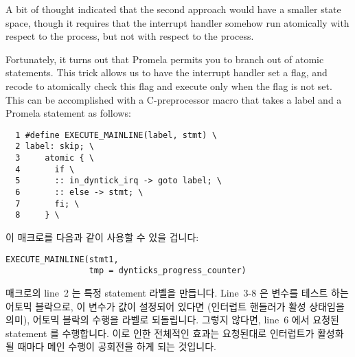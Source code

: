 A bit of thought indicated that the second approach would have a
smaller state space, though it requires that the interrupt handler
somehow run atomically with respect to the 
process, but not with respect to the 
process.

Fortunately, it turns out that Promela permits you to branch
out of atomic statements.
This trick allows us to have the interrupt handler set a flag, and
recode  to atomically check this flag
and execute only when the flag is not set.
This can be accomplished with a C-preprocessor macro that takes
a label and a Promela statement as follows:
\fi

{ \scriptsize
\begin{verbatim}
  1 #define EXECUTE_MAINLINE(label, stmt) \
  2 label: skip; \
  3     atomic { \
  4       if \
  5       :: in_dyntick_irq -> goto label; \
  6       :: else -> stmt; \
  7       fi; \
  8     } \
\end{verbatim}
}

이 매크로를 다음과 같이 사용할 수 있을 겁니다:
\iffalse

One might use this macro as follows:
\fi

\vspace{5pt}
\begin{minipage}[t]{\columnwidth}
\scriptsize
\begin{verbatim}
EXECUTE_MAINLINE(stmt1,
                 tmp = dynticks_progress_counter)
\end{verbatim}
\end{minipage}
\vspace{5pt}

매크로의 line~2 는 특정 statement 라벨을 만듭니다.
Line~3-8 은  변수를 테스트 하는 어토믹 블락으로, 이 변수가
값이 설정되어 있다면 (인터럽트 핸들러가 활성 상태임을 의미), 어토믹 블락의
수행을 라벨로 되돌립니다.
그렇지 않다면, line~6 에서 요청된 statement 를 수행합니다.
이로 인한 전체적인 효과는 요청된대로 인터럽트가 활성화 될 때마다 메인 수행이
공회전을 하게 되는 것입니다.
\iffalse

Line~2 of the macro creates the specified statement label.
Lines~3-8 are an atomic block that tests the \co{in_dyntick_irq}
variable, and if this variable is set (indicating that the interrupt
handler is active), branches out of the atomic block back to the
label.
Otherwise, line~6 executes the specified statement.
The overall effect is that mainline execution stalls any time an interrupt
is active, as required.
\fi

